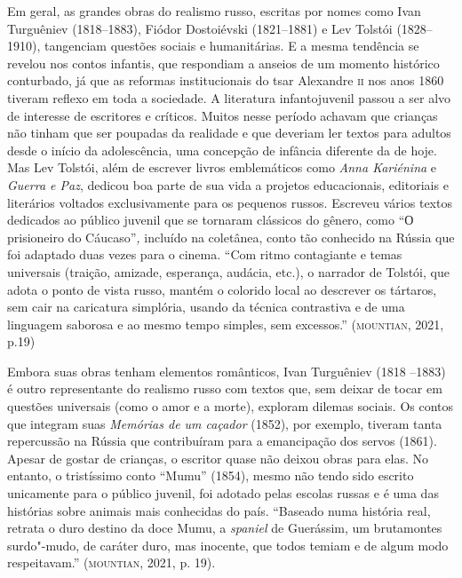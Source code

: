 \documentclass[11pt]{extarticle}
\begin{document}
Em geral, as grandes obras
do realismo russo, escritas por nomes como Ivan Turguêniev (1818--1883),
Fiódor Dostoiévski (1821--1881) e Lev Tolstói (1828--1910), tangenciam
questões sociais e humanitárias. E a mesma tendência se revelou nos
contos infantis, que respondiam a anseios de um momento histórico
conturbado, já que as reformas institucionais do tsar Alexandre \textsc{ii} nos
anos 1860 tiveram reflexo em toda a sociedade. A literatura
infantojuvenil passou a ser alvo de interesse de escritores e críticos.
Muitos nesse período achavam que crianças não tinham que ser poupadas da
realidade e que deveriam ler textos para adultos desde o início da
adolescência, uma concepção de infância diferente da de hoje. Mas Lev
Tolstói, além de escrever livros emblemáticos como \emph{Anna Kariénina}
e \emph{Guerra e Paz}, dedicou boa parte de sua vida a projetos
educacionais, editoriais e literários voltados exclusivamente para os
pequenos russos. Escreveu vários textos dedicados ao público juvenil que
se tornaram clássicos do gênero, como ``О prisioneiro do
Cáucaso''\emph{,} incluído na coletânea, conto tão conhecido na Rússia
que foi adaptado duas vezes para o cinema. ``Com ritmo contagiante e
temas universais (traição, amizade, esperança, audácia, etc.), o
narrador de Tolstói, que adota o ponto de vista russo, mantém o colorido
local ao descrever os tártaros, sem cair na caricatura simplória, usando
da técnica contrastiva e de uma linguagem saborosa e ao mesmo tempo
simples, sem excessos.'' (\textsc{mountian}, 2021, p.19)


Embora suas obras tenham elementos românticos, Ivan Turguêniev (1818
--1883) é outro representante do realismo russo com textos que, sem
deixar de tocar em questões universais (como o amor e a morte), exploram
dilemas sociais. Os contos que integram suas \emph{Memórias de um
caçador} (1852), por exemplo, tiveram tanta repercussão na Rússia que
contribuíram para a emancipação dos servos (1861). Apesar de gostar de
crianças, o escritor quase não deixou obras para elas. No entanto, o
tristíssimo conto ``Mumu'' (1854), mesmo não tendo sido escrito
unicamente para o público juvenil, foi adotado pelas escolas russas e é
uma das histórias sobre animais mais conhecidas do país. ``Baseado numa
história real, retrata o duro destino da doce Mumu, a \emph{spaniel} de
Guerássim, um brutamontes surdo"-mudo, de caráter duro, mas inocente, que
todos temiam e de algum modo respeitavam.'' (\textsc{mountian}, 2021, p. 19).
\end{document}
